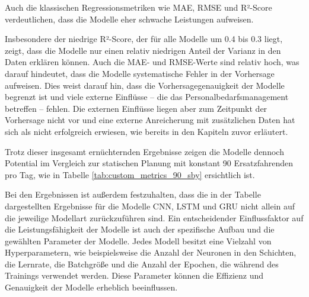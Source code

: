 \documentclass[%
pdftex,
oneside,			%
11pt,				%
parskip=half,		%
headheight = 12pt,	%
headsepline,		%
footsepline,		%
footheight = 16pt,	%
abstracton,		%
DIV=calc,		%
BCOR=8mm,		%
headinclude=false,	%
footinclude=false,	%
listof=totoc,		%
toc=bibliography,	%
]{scrreprt}	%
\begin{document}
            Auch die klassischen Regressionsmetriken wie MAE, RMSE und R²-Score verdeutlichen, dass die Modelle eher schwache Leistungen aufweisen.

            Insbesondere der niedrige R²-Score, der für alle Modelle um 0.4 bis 0.3 liegt, zeigt, dass die Modelle nur einen relativ niedrigen Anteil der Varianz in den Daten erklären können. 
            Auch die MAE- und RMSE-Werte sind relativ hoch, was darauf hindeutet, dass die Modelle systematische Fehler in der Vorhersage aufweisen.
            Dies weist darauf hin, dass die Vorhersagegenauigkeit der Modelle begrenzt ist und viele externe Einflüsse -- die das Personalbedarfsmanagement betreffen -- fehlen.
            Die externen Einflüsse liegen aber zum Zeitpunkt der Vorhersage nicht vor und eine externe Anreicherung mit zusätzlichen Daten hat sich als nicht erfolgreich erwiesen, wie bereits in den Kapiteln zuvor erläutert.

            Trotz dieser insgesamt ernüchternden Ergebnisse zeigen die Modelle dennoch Potential im Vergleich zur statischen Planung mit konstant 90 Ersatzfahrenden pro Tag, wie in Tabelle \ref{tab:custom_metrics_90_sby} ersichtlich ist. 


            
            Bei den Ergebnissen ist außerdem festzuhalten, dass die in der Tabelle dargestellten Ergebnisse für die Modelle CNN, LSTM und GRU nicht allein auf die jeweilige Modellart zurückzuführen sind. 
            Ein entscheidender Einflussfaktor auf die Leistungsfähigkeit der Modelle ist auch der spezifische Aufbau und die gewählten Parameter der Modelle. 
            Jedes Modell besitzt eine Vielzahl von Hyperparametern, wie beispielsweise die Anzahl der Neuronen in den Schichten, die Lernrate, die Batchgröße und die Anzahl der Epochen, die während des Trainings verwendet werden. 
            Diese Parameter können die Effizienz und Genauigkeit der Modelle erheblich beeinflussen.
\end{document}
